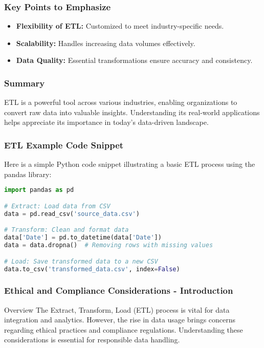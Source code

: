 \documentclass[aspectratio=169]{beamer}
\begin{document}
\begin{frame}[fragile]
    \frametitle{Key Points to Emphasize}
    \begin{itemize}
        \item \textbf{Flexibility of ETL:} Customized to meet industry-specific needs.
        \item \textbf{Scalability:} Handles increasing data volumes effectively.
        \item \textbf{Data Quality:} Essential transformations ensure accuracy and consistency.
    \end{itemize}
\end{frame}

\begin{frame}[fragile]
    \frametitle{Summary}
    ETL is a powerful tool across various industries, enabling organizations to convert raw data into valuable insights. Understanding its real-world applications helps appreciate its importance in today's data-driven landscape.
\end{frame}

\begin{frame}[fragile]
    \frametitle{ETL Example Code Snippet}
    Here is a simple Python code snippet illustrating a basic ETL process using the pandas library:
    \begin{lstlisting}[language=Python]
import pandas as pd

# Extract: Load data from CSV
data = pd.read_csv('source_data.csv')

# Transform: Clean and format data
data['Date'] = pd.to_datetime(data['Date'])
data = data.dropna()  # Removing rows with missing values

# Load: Save transformed data to a new CSV
data.to_csv('transformed_data.csv', index=False)
    \end{lstlisting}
\end{frame}

\begin{frame}[fragile]
    \frametitle{Ethical and Compliance Considerations - Introduction}
    \begin{block}{Overview}
        The Extract, Transform, Load (ETL) process is vital for data integration and analytics. 
        However, the rise in data usage brings concerns regarding ethical practices and compliance regulations.
        Understanding these considerations is essential for responsible data handling.
    \end{block}
\end{frame}
\end{document}
